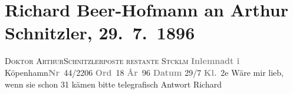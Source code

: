 

               \section[Richard Beer-Hofmann an Arthur Schnitzler, 29. 7. 1896]{ Richard Beer-Hofmann an Arthur Schnitzler, 29. 7. 1896}\nopagebreak{}\rehead{ }\begin{ledgroupsized}[t]{13cm}\normalsize\beginnumbering{} \toendnotes[C]{\smallbreak\pagebreak[2]} 
\pstart{}{\pb}\textsc{Doktor Arthur}\pend{}\pstart{}\textsc{Schnitzler}\pend{}\pstart{}\textsc{poste restante Stcklm}\pend{}{\bigskip}\pstart
           {\pb}\textcolor{gray}{\textbf{Inlemnadt i}}{ }Köpenhamn\textcolor{gray}{\textbf{Nr}} 44/2206{ }\textcolor{gray}{\textbf{Ord}} 18{ }\textcolor{gray}{\textbf{År}} 96{ }\textcolor{gray}{\textbf{Datum}}{ }29/7{ }\textcolor{gray}{\textbf{Kl.}} 2e\pend
           \pstart
           Wäre mir lieb, wenn sie schon 31 kämen bitte telegrafisch Antwort\pend
           \pstart \spacefill\mbox{Richard}\pend{}\endnumbering{}\end{ledgroupsized}  \newcommand{\dateiname}{L00573}\newcommand{\titel}{Richard Beer-Hofmann an Arthur Schnitzler, 29. 7. 1896}\newcommand{\editorInnen}{Martin Anton Müller und Gerd-Hermann Susen}
      
